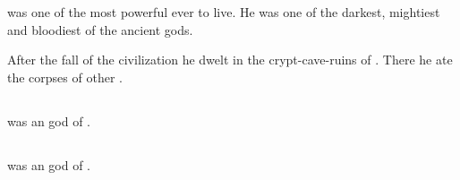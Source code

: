 \chapter{\Aryothim}















\section{\Gorgomon}
\index{\Gorgomon}
\Gorgomon was one of the most powerful \aryothim ever to live. 
He was one of the darkest, mightiest and bloodiest of the ancient \aryoth gods. 

After the fall of the \aryoth civilization he dwelt in the crypt-cave-ruins of .
There he ate the corpses of other \aryothim. 















\section{\Klaad}
\index{\Klaad}
\Klaad was an \aryoth god of .















\section{\Murru}
\index{\Murru}
\Murru was an \aryoth god of .





























